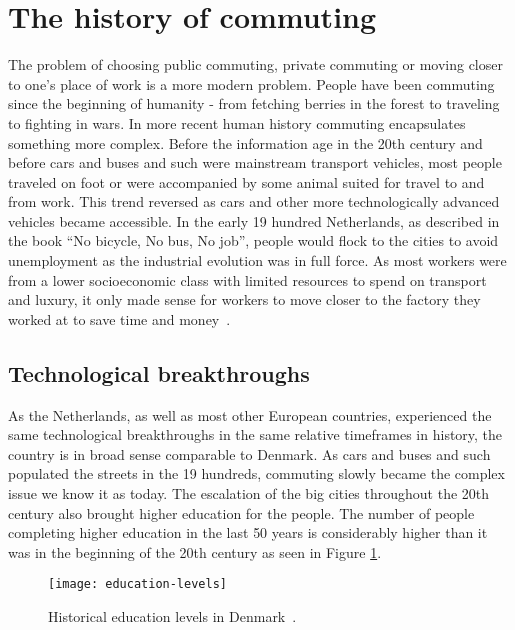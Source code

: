 \section{The history of commuting}\label{sec:the-history-of-commuting}

The problem of choosing public commuting, private commuting or moving closer to one's place of work is a more modern
problem.
People have been commuting since the beginning of humanity - from fetching berries in the forest to traveling to
fighting in wars.
In more recent human history commuting encapsulates something more complex.
Before the information age in the 20th century and before cars and buses and such were mainstream transport vehicles,
most people traveled on foot or were accompanied by some animal suited for travel to and from work.
This trend reversed as cars and other more technologically advanced vehicles became accessible.
In the early 19 hundred Netherlands, as described in the book ``No bicycle, No bus, No job'', people would flock to the
cities to avoid unemployment as the industrial evolution was in full force.
As most workers were from a lower socioeconomic class with limited resources to spend on transport and luxury, it only
made sense for workers to move closer to the factory they worked at to save time and money~\cite{bek2022}.

\subsection{Technological breakthroughs}\label{subsec:technological-breakthroughs}

As the Netherlands, as well as most other European countries, experienced the same technological breakthroughs in the
same relative timeframes in history, the country is in broad sense comparable to Denmark.
As cars and buses and such populated the streets in the 19 hundreds, commuting slowly became the complex issue we
know it as today.
The escalation of the big cities throughout the 20th century also brought higher education for the people.
The number of people completing higher education in the last 50 years is considerably higher than it was in the
beginning of the 20th century as seen in Figure \ref{fig:figure5}.

\begin{figure}
    \centering
    \texttt{[image: education-levels]}
    \caption{Historical education levels in Denmark~\cite{johansen2005}.}
    \label{fig:figure5}
\end{figure}

